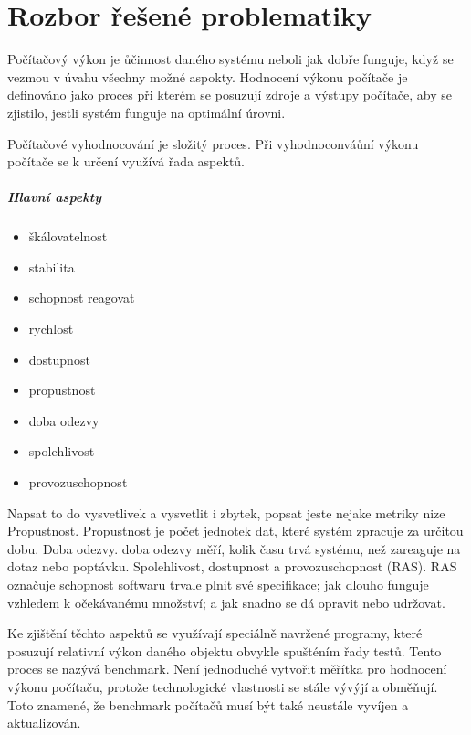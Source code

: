 \chapter{Rozbor řešené problematiky}

Počítačový výkon je ůčinnost daného systému neboli jak dobře funguje, když se vezmou v úvahu všechny možné aspokty.
Hodnocení výkonu počítače je definováno jako proces při kterém se posuzují zdroje a výstupy počítače, aby se zjistilo,
jestli systém funguje na optimální úrovni.

Počítačové vyhodnocování je složitý proces. Při vyhodnoconváůní výkonu počítače se k určení využívá řada aspektů.
\paragraph{Hlavní aspekty}\cite{metricsToday}
\begin{itemize}
    \item{škálovatelnost}
    \item{stabilita}
    \item{schopnost reagovat}
    \item{rychlost}
    \item{dostupnost}
    \item{propustnost}
    \item{doba odezvy}
    \item{spolehlivost}
    \item{provozuschopnost}
\end{itemize}

Napsat to do vysvetlivek a vysvetlit i zbytek, popsat jeste nejake metriky nize
Propustnost. Propustnost je počet jednotek dat, které systém zpracuje za určitou dobu.
Doba odezvy. doba odezvy měří, kolik času trvá systému, než zareaguje na dotaz nebo poptávku.
Spolehlivost, dostupnost a provozuschopnost (RAS). RAS označuje schopnost softwaru trvale plnit své specifikace; jak dlouho funguje vzhledem k očekávanému množství; a jak snadno se dá opravit nebo udržovat.

Ke zjištění těchto aspektů se využívají speciálně navržené programy, které posuzují relativní výkon daného objektu obvykle spušténím řady testů.
Tento proces se nazývá benchmark. Není jednoduché vytvořit měřítka pro hodnocení výkonu počítaču, protože technologické vlastnosti se stále vývýjí a obměňují.
Toto znamené, že benchmark počítačů musí být také neustále vyvíjen a aktualizován.

\iffalse
https://study.com/academy/lesson/computer-performance-evaluation-definition-challenges-parameters.html
\fi

